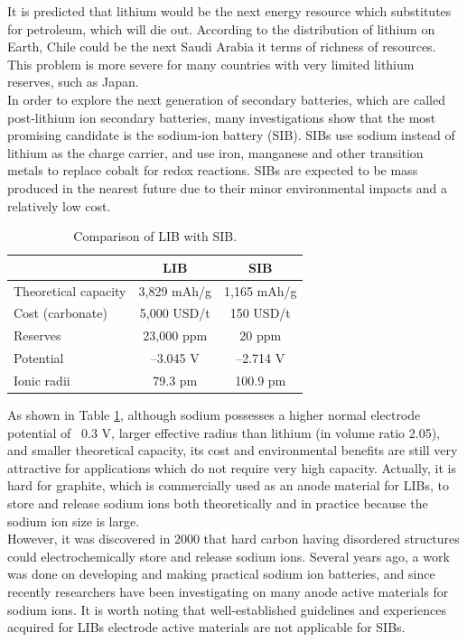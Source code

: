 It is predicted that lithium would be the next energy resource which substitutes for petroleum, which will die out.\cite{Jaskula2016} According to the distribution of lithium on Earth\cite{Jaskula2011a}, Chile could be the next Saudi Arabia it terms of richness of resources. This problem is more severe for many countries with very limited lithium reserves, such as Japan. \\
In order to explore the next generation of secondary batteries, which are called post-lithium ion secondary batteries, many investigations
show that the most promising candidate is the sodium-ion battery (SIB). SIBs use sodium instead of lithium as the charge carrier, and use iron, manganese and other transition metals to replace cobalt for redox reactions. SIBs are expected to be mass produced in the nearest future due to their minor environmental impacts and a relatively low cost.

\begin{table}[ht]
\centering %
\begin{tabular}{|l|c|c|} %
\hline %
 & LIB & SIB\\ [0.5ex] %
\hline %
Theoretical capacity & 3,829 mAh/g & 1,165 mAh/g \\[1.5ex] %
Cost (carbonate) & 5,000 USD/t & 150 USD/t \\[1.5ex]%
Reserves & 23,000 ppm & 20 ppm \\[1.5ex]
Potential & –3.045 V & –2.714 V \\[1.5ex]
Ionic radii & 79.3 pm & 100.9 pm \\[1.5ex]
\hline %
\end{tabular}
\caption{Comparison of LIB with SIB.} %
\label{table1.1} %
\end{table}

As shown in Table \ref{table1.1}, although sodium possesses a higher normal electrode potential of ~0.3 V, larger effective radius than lithium (in volume ratio 2.05), and smaller theoretical capacity, its cost and environmental benefits are still very attractive for applications which do not require very high capacity. Actually, it is hard for graphite, which is commercially used as an anode material for LIBs, to store and release sodium ions both theoretically and in practice because the sodium ion size is large. \\
However, it was discovered in 2000 that hard carbon having disordered structures could electrochemically store and release sodium ions.\cite{Stevens2000} Several years ago, a work was done on developing and making practical sodium ion batteries, and since recently researchers have been investigating on many anode active materials for sodium ions. It is worth noting that well-established guidelines and experiences acquired for LIBs electrode active materials are not applicable for SIBs.\cite{Lang2010,Armand2008,KUZE2013}

